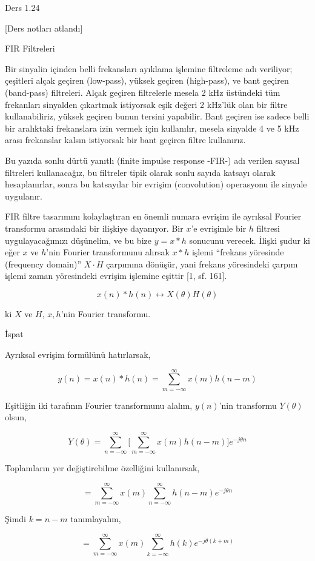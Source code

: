 \documentclass[12pt,fleqn]{article}\usepackage{../../common}
\begin{document}
Ders 1.24

[Ders notları atlandı]

FIR Filtreleri

Bir sinyalin içinden belli frekansları ayıklama işlemine filtreleme adı
veriliyor; çeşitleri alçak geçiren (low-pass), yüksek geçiren (high-pass),
ve bant geçiren (band-pass) filtreleri. Alçak geçiren filtrelerle mesela 2
kHz üstündeki tüm frekanları sinyalden çıkartmak istiyorsak eşik değeri 2
kHz'lük olan bir filtre kullanabiliriz, yüksek geçiren bunun tersini
yapabilir. Bant geçiren ise sadece belli bir aralıktaki frekanslara izin
vermek için kullanılır, mesela sinyalde 4 ve 5 kHz arası frekanslar kalsın
istiyorsak bir bant geçiren filtre kullanırız.

Bu yazıda sonlu dürtü yanıtlı (finite impulse response -FIR-) adı verilen
sayısal filtreleri kullanacağız, bu filtreler tipik olarak sonlu sayıda
katsayı olarak hesaplanırlar, sonra bu katsayılar bir evrişim
(convolution) operasyonu ile sinyale uygulanır.

FIR filtre tasarımını kolaylaştıran en önemli numara evrişim ile ayrıksal
Fourier transformu arasındaki bir ilişkiye dayanıyor. Bir $x$'e evrişimle
bir $h$ filtresi uygulayacağımızı düşünelim, ve bu bize $y = x * h$
sonucunu verecek. İlişki şudur ki eğer $x$ ve $h$'nin Fourier transformunu
alırsak $x * h$ işlemi ``frekans yöresinde (frequency domain)'' $X \cdot H$
çarpımına dönüşür, yani frekans yöresindeki çarpım işlemi zaman yöresindeki
evrişim işlemine eşittir [1, sf. 161].

$$ x(n) * h(n) \leftrightarrow X(\theta)H(\theta)$$

ki $X$ ve $H$, $x,h$'nin Fourier transformu.

İspat

Ayrıksal evrişim formülünü hatırlarsak,

$$ y(n) = x(n) * h(n) = \sum _{m=-\infty}^{\infty} x(m) h(n-m) $$

Eşitliğin iki tarafının Fourier transformunu alalım, $y(n)$'nin transformu
$Y(\theta)$ olsun,

$$  
Y(\theta) = \sum_{n=-\infty}^{\infty} \bigg[
\sum_{m=-\infty}^{\infty} x(m) h(n-m)
\bigg] e^{-j\theta n}
$$

Toplamların yer değiştirebilme özelliğini kullanırsak, 

$$ 
= \sum_{m=-\infty}^{\infty} x(m)  \sum_{n=-\infty}^{\infty} h(n-m)  e^{-j\theta n}
$$

Şimdi $k = n-m$ tanımlayalım, 

$$  
= \sum_{m=-\infty}^{\infty} x(m)  \sum_{k=-\infty}^{\infty} h(k)  e^{-j\theta (k+m)}
$$
\end{document}
